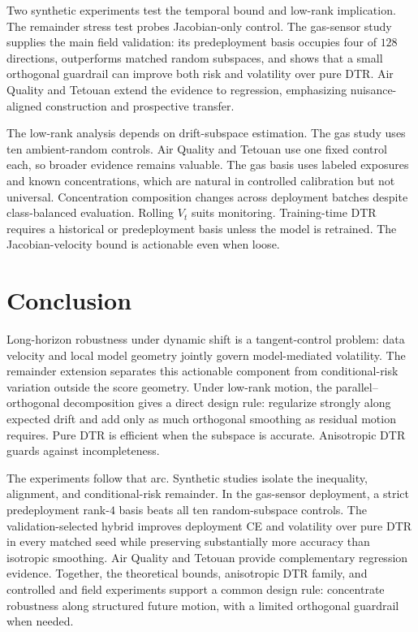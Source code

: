 \documentclass[conference]{IEEEtran}
\begin{document}
Two synthetic experiments test the temporal bound and low-rank implication. The remainder stress test probes Jacobian-only control. The gas-sensor study supplies the main field validation: its predeployment basis occupies four of $128$ directions, outperforms matched random subspaces, and shows that a small orthogonal guardrail can improve both risk and volatility over pure DTR. Air Quality and Tetouan extend the evidence to regression, emphasizing nuisance-aligned construction and prospective transfer.

The low-rank analysis depends on drift-subspace estimation. The gas study uses ten ambient-random controls. Air Quality and Tetouan use one fixed control each, so broader evidence remains valuable. The gas basis uses labeled exposures and known concentrations, which are natural in controlled calibration but not universal. Concentration composition changes across deployment batches despite class-balanced evaluation. Rolling $V_t$ suits monitoring. Training-time DTR requires a historical or predeployment basis unless the model is retrained. The Jacobian-velocity bound is actionable even when loose.

\balance
\section{Conclusion}
Long-horizon robustness under dynamic shift is a tangent-control problem: data velocity and local model geometry jointly govern model-mediated volatility. The remainder extension separates this actionable component from conditional-risk variation outside the score geometry. Under low-rank motion, the parallel--orthogonal decomposition gives a direct design rule: regularize strongly along expected drift and add only as much orthogonal smoothing as residual motion requires. Pure DTR is efficient when the subspace is accurate. Anisotropic DTR guards against incompleteness.

The experiments follow that arc. Synthetic studies isolate the inequality, alignment, and conditional-risk remainder. In the gas-sensor deployment, a strict predeployment rank-$4$ basis beats all ten random-subspace controls. The validation-selected hybrid improves deployment CE and volatility over pure DTR in every matched seed while preserving substantially more accuracy than isotropic smoothing. Air Quality and Tetouan provide complementary regression evidence. Together, the theoretical bounds, anisotropic DTR family, and controlled and field experiments support a common design rule: concentrate robustness along structured future motion, with a limited orthogonal guardrail when needed.
\end{document}
